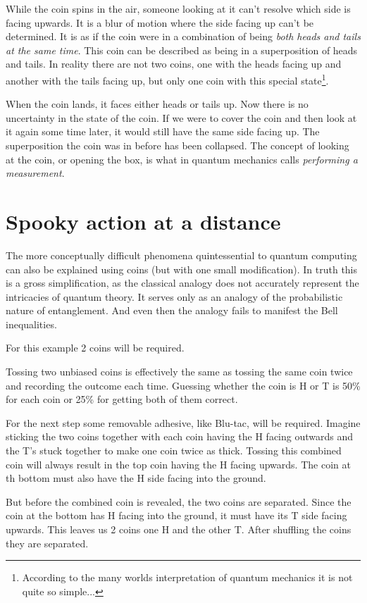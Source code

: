 \documentclass{book}
\begin{document}
While the coin spins in the air, someone looking at it can't resolve which side is facing upwards. It is a blur of motion where the side facing up can't be determined. It is as if the coin were in a combination of being \textit{both heads and tails at the same time}.  This coin can be described as being in a superposition of heads and tails. In reality there are not two coins, one with the heads facing up and another with the tails facing up, but only one coin with this special state\footnote{According to the many worlds interpretation of quantum mechanics it is not quite so simple...}.

When the coin lands, it faces either heads or tails up. Now there is no uncertainty in the state of the coin. If we were to cover the coin and then look at it again some time later, it would still have the same side facing up. The superposition the coin was in before has been collapsed. The concept of looking at the coin, or opening the box, is what in quantum mechanics calls \textit{performing a measurement}.


\section{Spooky action at a distance}


The more conceptually difficult phenomena quintessential to quantum computing can also be explained using coins (but with one small modification). In truth this is a gross simplification, as the classical analogy does not accurately represent the intricacies of quantum theory. It serves only as an analogy of the probabilistic nature of entanglement. And even then the analogy fails to manifest the Bell inequalities. 

For this example 2 coins will be required. 

Tossing two unbiased coins is effectively the same as tossing the same coin twice and recording the outcome each time. Guessing whether the coin is H or T is 50\% for each coin or 25\% for getting both of them correct. 

For the next step some removable adhesive, like Blu-tac, will be required. Imagine sticking the two coins together with each coin having the H facing outwards and the T's stuck together to make one coin twice as thick. Tossing this combined coin will always result in the top coin having the H facing upwards. The coin at th bottom must also have the H side facing into the ground. 

But before the combined coin is revealed, the two coins are separated. Since the coin at the bottom has H facing into the ground, it must have its T side facing upwards. This leaves us 2 coins one H and the other T. After shuffling the coins they are separated. 
\end{document}
